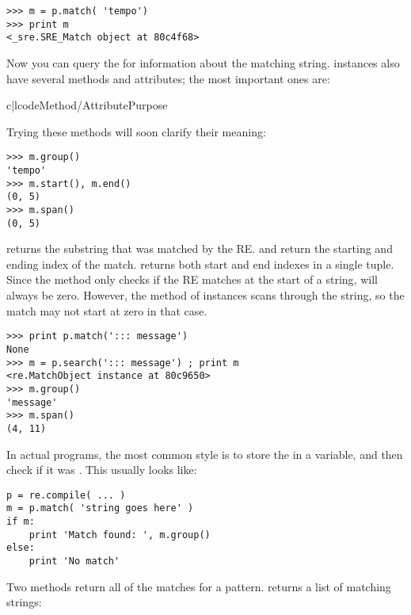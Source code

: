 \documentclass{howto}
\begin{document}
\begin{verbatim}
>>> m = p.match( 'tempo')
>>> print m
<_sre.SRE_Match object at 80c4f68>
\end{verbatim}

Now you can query the  for information about the
matching string.    instances also have several
methods and attributes; the most important ones are:

\begin{tableii}{c|l}{code}{Method/Attribute}{Purpose}
\end{tableii}

Trying these methods will soon clarify their meaning:

\begin{verbatim}
>>> m.group()
'tempo'
>>> m.start(), m.end()
(0, 5)
>>> m.span()
(0, 5)
\end{verbatim}

 returns the substring that was matched by the
RE.   and  return the starting and
ending index of the match.  returns both start and end
indexes in a single tuple.  Since the  method only
checks if the RE matches at the start of a string,
 will always be zero.  However, the 
method of  instances scans through the string, so 
the match may not start at zero in that case.

\begin{verbatim}
>>> print p.match('::: message')
None
>>> m = p.search('::: message') ; print m
<re.MatchObject instance at 80c9650>
>>> m.group()
'message'
>>> m.span()
(4, 11)
\end{verbatim}

In actual programs, the most common style is to store the
 in a variable, and then check if it was
.  This usually looks like:

\begin{verbatim}
p = re.compile( ... )
m = p.match( 'string goes here' )
if m:
    print 'Match found: ', m.group()
else:
    print 'No match'
\end{verbatim}

Two  methods return all of the matches for a pattern.
 returns a list of matching strings:
\end{document}
